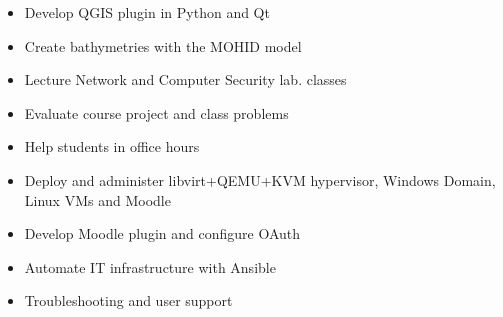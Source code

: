 \documentclass[10pt,a4paper,ragged2e,withhyper]{altacv}
\begin{document}


\makecvheader


\begin{paracol}{2}

\begin{itemize}
\item Develop QGIS plugin in Python and Qt
\item Create bathymetries with the MOHID model
\end{itemize}
\divider

\begin{itemize}
\item Lecture Network and Computer Security lab. classes
\item Evaluate course project and class problems
\item Help students in office hours
\end{itemize}
\divider

\begin{itemize}
\item Deploy and administer libvirt+QEMU+KVM hypervisor, Windows Domain, Linux VMs and Moodle
\item Develop Moodle plugin and configure OAuth
\item Automate IT infrastructure with Ansible
\item Troubleshooting and user support
\end{itemize}
\divider


\end{paracol}
\end{document}
